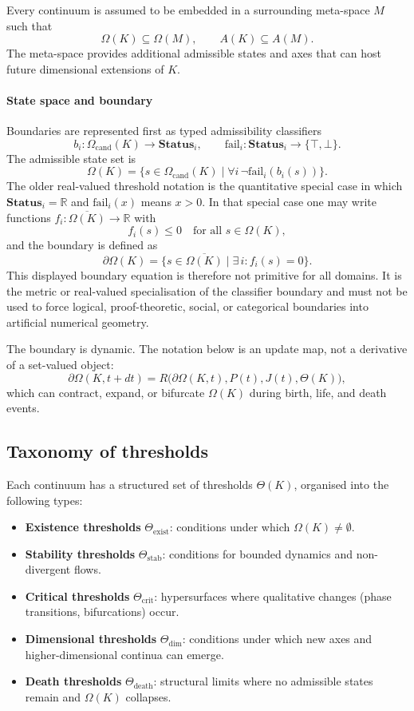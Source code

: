 Every continuum is assumed to be embedded in a surrounding meta-space \(M\) such that
\[
    \Omega(K)\subseteq\Omega(M), \qquad A(K)\subseteq A(M).
\]
The meta-space provides additional admissible states and axes that can host future dimensional extensions of \(K\).

\paragraph{State space and boundary}
Boundaries are represented first as typed admissibility classifiers
\[
    b_i:\Omega_{\mathrm{cand}}(K)\to \mathbf{Status}_i,
    \qquad
    \mathrm{fail}_i:\mathbf{Status}_i\to\{\top,\bot\}.
\]
The admissible state set is
\[
    \Omega(K)=\{s\in\Omega_{\mathrm{cand}}(K)\mid
    \forall i\,\neg\mathrm{fail}_i(b_i(s))\}.
\]
The older real-valued threshold notation is the quantitative special case in
which \(\mathbf{Status}_i=\mathbb{R}\) and \(\mathrm{fail}_i(x)\) means
\(x>0\). In that special case one may write functions
\(f_i : \overline{\Omega(K)} \to \mathbb{R}\) with
\[
    f_i(s) \le 0 \quad\text{for all } s \in \Omega(K),
\]
and the boundary is defined as
\[
    \partial\Omega(K) = \{ s \in \overline{\Omega(K)} \mid \exists\, i: f_i(s) = 0 \}.
\]
This displayed boundary equation is therefore not primitive for all domains. It
is the metric or real-valued specialisation of the classifier boundary and
must not be used to force logical, proof-theoretic, social, or categorical
boundaries into artificial numerical geometry.

The boundary is dynamic. The notation below is an update map, not a derivative
of a set-valued object:
\[
    \partial\Omega(K,t+dt) =
    R\big(\partial\Omega(K,t),P(t),J(t),\Theta(K)\big),
\]
which can contract, expand, or bifurcate \(\Omega(K)\) during birth, life, and death events.

\subsection{Taxonomy of thresholds}

Each continuum has a structured set of thresholds \(\Theta(K)\), organised into the following types:

\begin{itemize}
    \item \textbf{Existence thresholds} \(\Theta_{\mathrm{exist}}\): conditions under which \(\Omega(K)\neq\emptyset\).
    \item \textbf{Stability thresholds} \(\Theta_{\mathrm{stab}}\): conditions for bounded dynamics and non-divergent flows.
    \item \textbf{Critical thresholds} \(\Theta_{\mathrm{crit}}\): hypersurfaces where qualitative changes (phase transitions, bifurcations) occur.
    \item \textbf{Dimensional thresholds} \(\Theta_{\mathrm{dim}}\): conditions under which new axes and higher-dimensional continua can emerge.
    \item \textbf{Death thresholds} \(\Theta_{\mathrm{death}}\): structural limits where no admissible states remain and \(\Omega(K)\) collapses.
\end{itemize}


